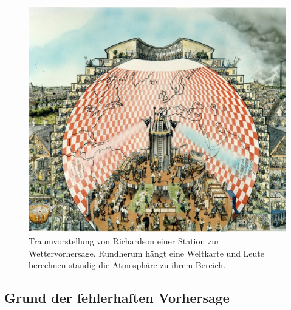 \begin{figure}
	\centering
	\includegraphics[width=\textwidth]{Richardsons_Traum.jpg}
	\caption{Traumvorstellung von Richardson einer Station zur Wettervorhersage. 
	Rundherum hängt eine Weltkarte und Leute berechnen ständig die Atmosphäre zu ihrem Bereich.}
	\label{bild:richardsonsTraum}
\end{figure}

\subsection{Grund der fehlerhaften Vorhersage \label{geostrophisch:subsection:failedPrediction}}

